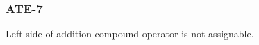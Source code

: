 \subsubsection{ATE-7}\label{sec:error_code_ate_7}

Left side of addition compound operator is not assignable.


